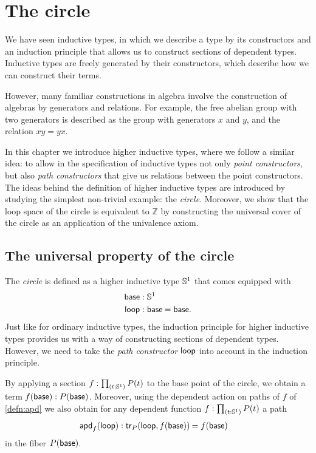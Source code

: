 
\chapter{The circle}

We have seen inductive types, in which we describe a type by its constructors and an induction principle that allows us to construct sections of dependent types. Inductive types are freely generated by their constructors, which describe how we can construct their terms. 

However, many familiar constructions in algebra involve the construction of algebras by generators and relations. 
For example, the free abelian group with two generators is described as the group with generators $x$ and $y$, and the relation $xy=yx$. 

In this chapter we introduce higher inductive types, where we follow a similar idea: to allow in the specification of inductive types not only \emph{point constructors}, but also \emph{path constructors} that give us relations between the point constructors. 
The ideas behind the definition of higher inductive types are introduced by studying the simplest non-trivial example: the \emph{circle}.
Moreover, we show that the loop space of the circle is equivalent to $\mathbb{Z}$ by constructing the universal cover of the circle as an application of the univalence axiom. 

\section{The universal property of the circle}
The \emph{circle} is defined as a higher inductive type $\mathbb{S}^{1}$ that comes equipped with
\begin{align*}
\base & : \sphere{1} \\
\lloop & : \id{\base}{\base}.
\end{align*}
Just like for ordinary inductive types, the induction principle for higher inductive types provides us with a way of constructing sections of dependent types. However, we need to take the \emph{path constructor} $\mathsf{loop}$ into account in the induction principle. 

By applying a section $f:\prd{t:\sphere{1}}P(t)$ to the base point of the circle, we obtain a term $f(\mathsf{base}):P(\mathsf{base})$. Moreover, using the dependent action on paths of $f$ of \autoref{defn:apd} we also obtain for any dependent function $f:\prd{t:\sphere{1}}P(t)$ a path
\begin{align*}
\apd{f}{\lloop} & : \id{\mathsf{tr}_P(\lloop,f(\base))}{f(\base)}
\end{align*}
in the fiber $P(\mathsf{base})$.

